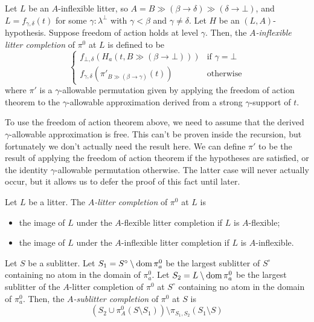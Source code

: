 \documentclass{article}
\begin{document}
\begin{definition}
    Let \( L \) be an \( A \)-inflexible litter, so \( A = B \gg (\beta \longrightarrow \delta) \gg (\delta \longrightarrow \bot) \), and \( L = f_{\gamma,\delta}(t) \) for some \( \gamma : \lambda^\bot \) with \( \gamma < \beta \) and \( \gamma \neq \delta \).
    Let \( H \) be an \( (L, A) \)-hypothesis.
    Suppose freedom of action holds at level \( \gamma \).
    Then, the \emph{\( A \)-inflexible litter completion} of \( \pi^0 \) at \( L \) is defined to be
    \[ \begin{cases}
        f_{\bot,\delta}(H_a(t, B \gg (\beta \longrightarrow \bot))) & \text{if } \gamma = \bot \\
        f_{\gamma,\delta}(\pi'_{B \gg (\beta \longrightarrow \gamma)}(t)) & \text{otherwise}
    \end{cases} \]
    where \( \pi' \) is a \( \gamma \)-allowable permutation given by applying the freedom of action theorem to the \( \gamma \)-allowable approximation derived from a strong \( \gamma \)-support of \( t \).
\end{definition}
\begin{remark}
    To use the freedom of action theorem above, we need to assume that the derived \( \gamma \)-allowable approximation is free.
    This can't be proven inside the recursion, but fortunately we don't actually need the result here.
    We can define \( \pi' \) to be the result of applying the freedom of action theorem if the hypotheses are satisfied, or the identity \( \gamma \)-allowable permutation otherwise.
    The latter case will never actually occur, but it allows us to defer the proof of this fact until later.
\end{remark}
\begin{definition}
    Let \( L \) be a litter.
    The \emph{\( A \)-litter completion} of \( \pi^0 \) at \( L \) is
    \begin{itemize}
        \item the image of \( L \) under the \( A \)-flexible litter completion if \( L \) is \( A \)-flexible;
        \item the image of \( L \) under the \( A \)-inflexible litter completion if \( L \) is \( A \)-inflexible.
    \end{itemize}
\end{definition}
\begin{definition}
    Let \( S \) be a sublitter.
    Let \( S_1 = S^\circ \setminus \operatorname{dom} \pi^0_a \) be the largest sublitter of \( S^\circ \) containing no atom in the domain of \( \pi^0_a \).
    Let \( S_2 = L \setminus \operatorname{dom} \pi^0_a \) be the largest sublitter of the \( A \)-litter completion of \( \pi^0 \) at \( S^\circ \) containing no atom in the domain of \( \pi^0_a \).
    Then, the \emph{\( A \)-sublitter completion} of \( \pi^0 \) at \( S \) is
    \[ (S_2 \cup \pi^0_A(S \setminus S_1)) \setminus \pi_{S_1,S_2}(S_1 \setminus S) \]
\end{definition}
\end{document}

